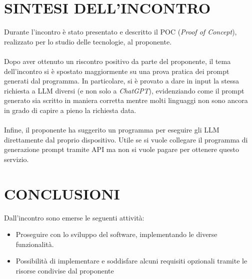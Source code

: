 \documentclass[5pt]{article}
\begin{document}
\section{SINTESI DELL'INCONTRO}
Durante l'incontro è stato presentato e descritto il POC (\textit{Proof of Concept}), realizzato per lo studio delle tecnologie, al proponente.\\ \\
Dopo aver ottenuto un riscontro positivo da parte del proponente, il tema dell'incontro si è spostato maggiormente su una prova pratica dei prompt generati dal programma. In particolare, si è provato a dare in input la stessa richiesta a LLM diversi (e non solo a \textit{ChatGPT}), evidenziando come il prompt generato sia scritto in maniera corretta mentre molti linguaggi non sono ancora in grado di capire a pieno la richiesta data.\\ \\
Infine, il proponente ha suggerito un programma per eseguire gli LLM direttamente dal proprio dispositivo. Utile se si vuole collegare il programma di generazione prompt tramite API ma non si vuole pagare per ottenere questo servizio.

\section{CONCLUSIONI}
Dall'incontro sono emerse le seguenti attività: 
\begin{itemize}
    \item Proseguire con lo sviluppo del software, implementando le diverse funzionalità.
    \item Possibilità di implementare e soddisfare alcuni requisiti opzionali tramite le risorse condivise dal proponente
\end{itemize}
\end{document}
